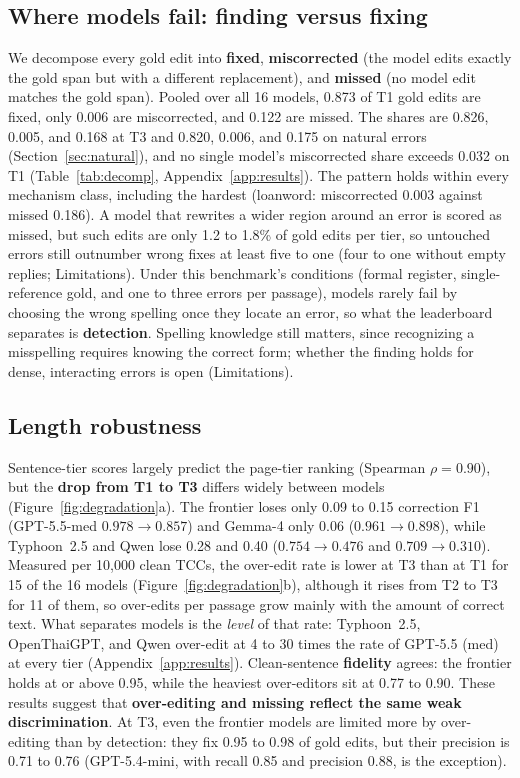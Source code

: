 \documentclass[11pt]{article}
\begin{document}
\subsection{Where models fail: finding versus fixing}
\label{sec:detection}
We decompose every gold edit into \textbf{fixed}, \textbf{miscorrected} (the model edits
exactly the gold span but with a different replacement), and \textbf{missed} (no model edit
matches the gold span). Pooled over all 16 models, 0.873 of T1 gold edits are fixed, only 0.006
are miscorrected, and 0.122 are missed. The shares are 0.826, 0.005, and 0.168 at T3 and 0.820,
0.006, and 0.175 on natural errors (Section~\ref{sec:natural}), and no single model's
miscorrected share exceeds 0.032 on T1 (Table~\ref{tab:decomp}, Appendix~\ref{app:results}). The
pattern holds within every mechanism class, including the hardest (loanword: miscorrected 0.003
against missed 0.186). A model that rewrites a wider region around an error is scored as
missed, but such edits are only 1.2 to 1.8\% of gold edits per tier, so untouched errors still
outnumber wrong fixes at least five to one (four to one without empty replies; Limitations).
Under this benchmark's conditions (formal register, single-reference gold, and one to three errors
per passage), models rarely fail by choosing the wrong spelling once they locate an error, so
what the leaderboard separates is \textbf{detection}. Spelling knowledge still matters, since
recognizing a misspelling requires knowing the correct form; whether the finding holds for
dense, interacting errors is open (Limitations).

\subsection{Length robustness}
\label{sec:length}
Sentence-tier scores largely predict the page-tier ranking (Spearman $\rho = 0.90$), but the
\textbf{drop from T1 to T3} differs widely between models (Figure~\ref{fig:degradation}a). The
frontier loses only 0.09 to 0.15 correction F1 (GPT-5.5-med $0.978{\to}0.857$) and Gemma-4 only
0.06 ($0.961{\to}0.898$), while Typhoon~2.5 and Qwen lose 0.28 and 0.40 ($0.754{\to}0.476$ and
$0.709{\to}0.310$). Measured per 10{,}000 clean TCCs, the over-edit rate is lower at T3 than at
T1 for 15 of the 16 models (Figure~\ref{fig:degradation}b), although it rises from T2 to T3 for 11 of
them, so over-edits per passage grow mainly with the amount of correct text. What separates models is the
\emph{level} of that rate: Typhoon~2.5, OpenThaiGPT, and Qwen over-edit at 4 to 30 times the
rate of GPT-5.5 (med) at every tier (Appendix~\ref{app:results}). Clean-sentence
\textbf{fidelity} agrees: the frontier holds at or above 0.95, while the heaviest over-editors sit
at 0.77 to 0.90. These results suggest that \textbf{over-editing and missing reflect the same
weak discrimination}. At T3, even the frontier models are
limited more by over-editing than by detection: they fix 0.95 to 0.98 of gold edits, but their
precision is 0.71 to 0.76 (GPT-5.4-mini, with recall 0.85 and precision 0.88, is the exception).
\end{document}
